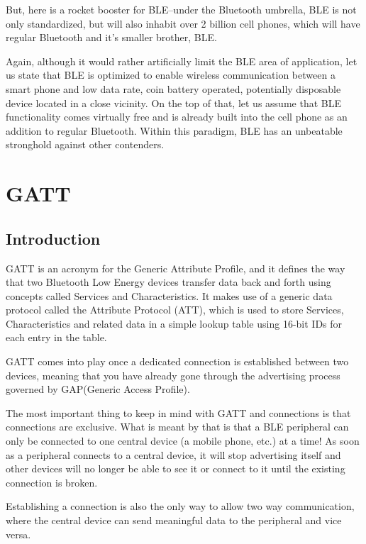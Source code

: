 \documentclass[11pt,a4paper]{article}
\begin{document}
{ 

But, here is a rocket booster for BLE--under the Bluetooth umbrella, BLE is not only standardized, but will also inhabit over 2 billion cell phones, which will have regular Bluetooth and it's smaller brother, BLE.

 

Again, although it would rather artificially limit the BLE area of application, let us state that BLE is optimized to enable wireless communication between a smart phone and low data rate, coin battery operated, potentially disposable device located in a close vicinity. On the top of that, let us assume that BLE functionality comes virtually free and is already built into the cell phone as an addition to regular Bluetooth. Within this paradigm, BLE has an unbeatable stronghold against other contenders.
	}
	
	
	
	    \newpage
		\section{GATT}
		\subsection{Introduction }
	{
    GATT is an acronym for the Generic Attribute Profile, and it defines the way that two Bluetooth Low Energy devices transfer data back and forth using concepts called Services and Characteristics. It makes use of a generic data protocol called the Attribute Protocol (ATT), which is used to store Services, Characteristics and related data in a simple lookup table using 16-bit IDs for each entry in the table.

GATT comes into play once a dedicated connection is established between two devices, meaning that you have already gone through the advertising process governed by GAP(Generic Access Profile).

The most important thing to keep in mind with GATT and connections is that connections are exclusive. What is meant by that is that a BLE peripheral can only be connected to one central device (a mobile phone, etc.) at a time! As soon as a peripheral connects to a central device, it will stop advertising itself and other devices will no longer be able to see it or connect to it until the existing connection is broken.

Establishing a connection is also the only way to allow two way communication, where the central device can send meaningful data to the peripheral and vice versa.
	}
	\newpage
\end{document}
